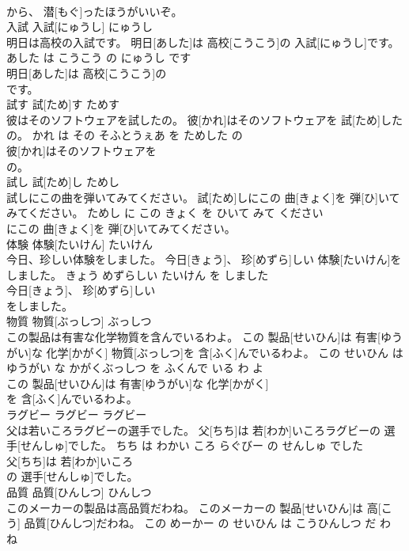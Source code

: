 \documentclass[8pt]{extreport}
\begin{document}
\begin{CJK}{UTF8}{min}
\\	から、 潜[もぐ]ったほうがいいぞ。			
\\	入試	入試[にゅうし]	にゅうし	
\\	明日は高校の入試です。	明日[あした]は 高校[こうこう]の 入試[にゅうし]です。	あした は こうこう の にゅうし です	
\\	明日[あした]は 高校[こうこう]の
\\	です。			
\\	試す	試[ため]す	ためす	
\\	彼はそのソフトウェアを試したの。	彼[かれ]はそのソフトウェアを 試[ため]したの。	かれ は その そふとうぇあ を ためした の	
\\	彼[かれ]はそのソフトウェアを
\\	の。			
\\	試し	試[ため]し	ためし	
\\	試しにこの曲を弾いてみてください。	試[ため]しにこの 曲[きょく]を 弾[ひ]いてみてください。	ためし に この きょく を ひいて みて ください	
\\	にこの 曲[きょく]を 弾[ひ]いてみてください。			
\\	体験	体験[たいけん]	たいけん	
\\	今日、珍しい体験をしました。	今日[きょう]、 珍[めずら]しい 体験[たいけん]をしました。	きょう めずらしい たいけん を しました	
\\	今日[きょう]、 珍[めずら]しい
\\	をしました。			
\\	物質	物質[ぶっしつ]	ぶっしつ	
\\	この製品は有害な化学物質を含んでいるわよ。	この 製品[せいひん]は 有害[ゆうがい]な 化学[かがく] 物質[ぶっしつ]を 含[ふく]んでいるわよ。	この せいひん は ゆうがい な かがくぶっしつ を ふくんで いる わ よ	
\\	この 製品[せいひん]は 有害[ゆうがい]な 化学[かがく]
\\	を 含[ふく]んでいるわよ。			
\\	ラグビー	ラグビー	ラグビー	
\\	父は若いころラグビーの選手でした。	父[ちち]は 若[わか]いころラグビーの 選手[せんしゅ]でした。	ちち は わかい ころ らぐびー の せんしゅ でした	
\\	父[ちち]は 若[わか]いころ
\\	の 選手[せんしゅ]でした。			
\\	品質	品質[ひんしつ]	ひんしつ	
\\	このメーカーの製品は高品質だわね。	このメーカーの 製品[せいひん]は 高[こう] 品質[ひんしつ]だわね。	この めーかー の せいひん は こうひんしつ だ わ ね	

\end{CJK}
\end{document}
